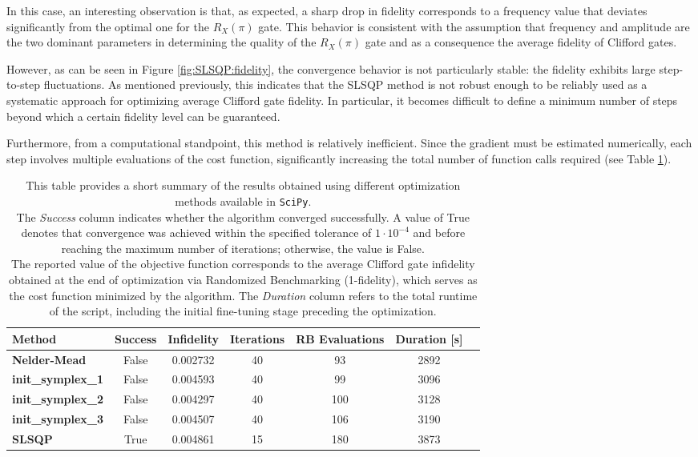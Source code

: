 In this case, an interesting observation is that, as expected, a sharp drop in fidelity corresponds to a frequency value that deviates significantly from the optimal one for the $R_X(\pi)$ gate.
This behavior is consistent with the assumption that frequency and amplitude are the two dominant parameters in determining the quality of the $R_X(\pi)$ gate and as a consequence the average fidelity of Clifford gates.

However, as can be seen in Figure \ref{fig:SLSQP:fidelity}, the convergence behavior is not particularly stable: the fidelity exhibits large step-to-step fluctuations. 
As mentioned previously, this indicates that the SLSQP method is not robust enough to be reliably used as a systematic approach for optimizing average Clifford gate fidelity.
In particular, it becomes difficult to define a minimum number of steps beyond which a certain fidelity level can be guaranteed.

Furthermore, from a computational standpoint, this method is relatively inefficient. 
Since the gradient must be estimated numerically, each step involves multiple evaluations of the cost function, significantly increasing the total number of function calls required (see Table \ref{tab:scipy_opt}).

\begin{table}[h]
    \centering
    \begin{tabular}{lcccccc}
        \toprule
        \textbf{Method} & \textbf{Success} & \textbf{Infidelity} & \textbf{Iterations} & \textbf{RB Evaluations} & \textbf{Duration [s]}\\
        \midrule
        \textbf{Nelder-Mead} & False & 0.002732 & 40 & 93 & 2892 \\
        \textbf{init\_symplex\_1} & False &  0.004593 & 40 & 99 & 3096\\
        \textbf{init\_symplex\_2} & False & 0.004297 & 40 & 100 & 3128\\
        \textbf{init\_symplex\_3} & False & 0.004507 & 40 & 106 & 3190\\
        \textbf{SLSQP} & True & 0.004861 & 15 & 180 & 3873\\
        \bottomrule
    \end{tabular}
    \caption{This table provides a short summary of the results obtained using different optimization methods available in \texttt{SciPy}.\\ 
    The \textit{Success} column indicates whether the algorithm converged successfully. 
    A value of True denotes that convergence was achieved within the specified tolerance of $1\cdot10^{-4}$ and before reaching the maximum number of iterations; otherwise, the value is False.\\
    The reported value of the objective function corresponds to the average Clifford gate infidelity obtained at the end of optimization via Randomized Benchmarking (1-fidelity), which serves as the cost function minimized by the algorithm.
    The \textit{Duration} column refers to the total runtime of the script, including the initial fine-tuning stage preceding the optimization.\\}
    \label{tab:scipy_opt}
\end{table}


